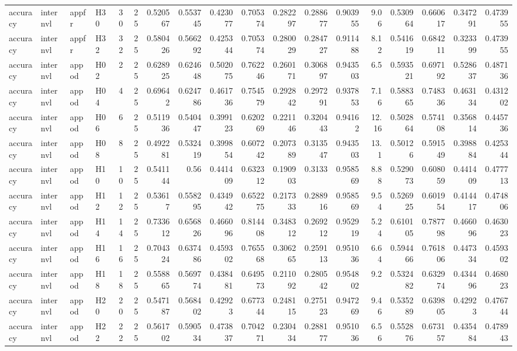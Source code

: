 \begin{longtable}{llllrrrrrrrrrrrrrr}
accuracy & internvl & appfr & H30 & 30 & 25 & 0.520567 & 0.553745 & 0.423077 & 0.705374 & 0.282297 & 0.288677 & 0.903955 & 9.06 & 0.530964 & 0.660617 & 0.347291 & 0.473955 \\
accuracy & internvl & appfr & H32 & 32 & 25 & 0.580426 & 0.566292 & 0.425344 & 0.705374 & 0.280029 & 0.284727 & 0.911488 & 8.12 & 0.541619 & 0.684211 & 0.323399 & 0.473955 \\
accuracy & internvl & appod & H02 & 2 & 25 & 0.628925 & 0.624648 & 0.502075 & 0.762246 & 0.260171 & 0.306897 & 0.943503 & 6.5 & 0.593521 & 0.697192 & 0.528637 & 0.487136 \\
accuracy & internvl & appod & H04 & 4 & 25 & 0.69642 & 0.624786 & 0.461736 & 0.754579 & 0.292842 & 0.297291 & 0.937853 & 7.16 & 0.588365 & 0.748336 & 0.463134 & 0.431202 \\
accuracy & internvl & appod & H06 & 6 & 25 & 0.511936 & 0.540447 & 0.399123 & 0.620269 & 0.221146 & 0.320443 & 0.94162 & 12.16 & 0.502864 & 0.574108 & 0.356814 & 0.445736 \\
accuracy & internvl & appod & H08 & 8 & 25 & 0.492281 & 0.532419 & 0.399854 & 0.607242 & 0.207389 & 0.313547 & 0.943503 & 13.1 & 0.50126 & 0.591549 & 0.398884 & 0.425344 \\
accuracy & internvl & appod & H10 & 10 & 25 & 0.541144 & 0.56 & 0.441409 & 0.632312 & 0.190903 & 0.3133 & 0.958569 & 8.88 & 0.529073 & 0.608059 & 0.441409 & 0.477713 \\
accuracy & internvl & appod & H12 & 12 & 25 & 0.53617 & 0.558295 & 0.434942 & 0.652275 & 0.217333 & 0.288916 & 0.958569 & 9.54 & 0.526925 & 0.601954 & 0.414417 & 0.474806 \\
accuracy & internvl & appod & H14 & 14 & 25 & 0.733612 & 0.656826 & 0.466096 & 0.814408 & 0.348312 & 0.269212 & 0.952919 & 5.24 & 0.610105 & 0.787798 & 0.466096 & 0.463023 \\
accuracy & internvl & appod & H16 & 16 & 25 & 0.704324 & 0.637486 & 0.459302 & 0.765568 & 0.306265 & 0.259113 & 0.951036 & 6.64 & 0.594466 & 0.761806 & 0.447334 & 0.459302 \\
accuracy & internvl & appod & H18 & 18 & 25 & 0.558865 & 0.569774 & 0.438481 & 0.649573 & 0.211092 & 0.280542 & 0.954802 & 9.2 & 0.532482 & 0.632974 & 0.434496 & 0.468023 \\
accuracy & internvl & appod & H20 & 20 & 25 & 0.547187 & 0.568402 & 0.42923 & 0.677344 & 0.248115 & 0.275123 & 0.947269 & 9.46 & 0.535289 & 0.639805 & 0.42923 & 0.476744 \\
accuracy & internvl & appod & H22 & 22 & 25 & 0.561702 & 0.590534 & 0.473837 & 0.704271 & 0.230434 & 0.288177 & 0.951036 & 6.56 & 0.552876 & 0.673157 & 0.435484 & 0.478943 \\

\end{longtable}
